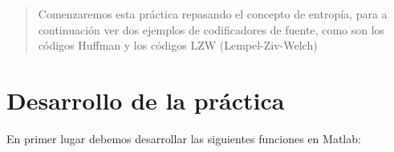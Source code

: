 \documentclass[es,practica]{uah}
\begin{document}
\profesor{}
\tel{}
\mail{} %
\date{} %

\maketitle

\begin{abstract}
Comenzaremos esta práctica repasando el concepto de entropía, para a continuación ver dos ejemplos de codificadores de fuente, como son los códigos Huffman y los códigos LZW (Lempel-Ziv-Welch)
\end{abstract}

\section{Desarrollo de la práctica}


En primer lugar debemos desarrollar las siguientes funciones en Matlab:
\end{document}
